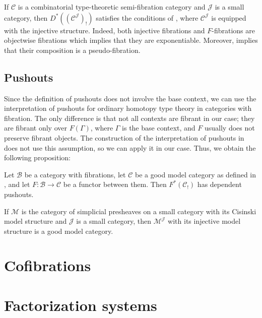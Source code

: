 \documentclass[reqno]{amsart}
\theoremstyle{definition}
\theoremstyle{remark}
\newcommand{\scat}[1]{\mathcal{#1}}
\numberwithin{figure}{section}
\begin{document}
\begin{example}
If $\scat{C}$ is a combinatorial type-theoretic semi-fibration category and $\scat{J}$ is a small category, then $D^*((\scat{C}^\scat{J})_!)$ satisfies the conditions of , where $\scat{C}^\scat{J}$ is equipped with the injective structure.
Indeed, both injective fibrations and $F$-fibrations are objectwise fibrations which implies that they are exponentiable.
Moreover,  implies that their composition is a pseudo-fibration.
\end{example}

\subsection{Pushouts}

Since the definition of pushouts does not involve the base context, we can use the interpretation of pushouts for ordinary homotopy type theory in categories with fibration.
The only difference is that not all contexts are fibrant in our case; they are fibrant only over $F(\Gamma)$, where $\Gamma$ is the base context, and $F$ usually does not preserve fibrant objects.
The construction of the interpretation of pushouts in \cite[Section~6]{lum-shul-hits} does not use this assumption, so we can apply it in our case.
Thus, we obtain the following proposition:

\begin{prop}
Let $\scat{B}$ be a category with fibrations, let $\scat{C}$ be a good model category as defined in \cite[Definition~2.1]{lum-shul-hits}, and let $F : \scat{B} \to \scat{C}$ be a functor between them.
Then $F^*(\scat{C}_!)$ has dependent pushouts.
\end{prop}

\begin{example}
If $\scat{M}$ is the category of simplicial presheaves on a small category with its Cisinski model structure \cite{cisinski-presheaf,cisinski} and $\scat{J}$ is a small category, then $\scat{M}^\scat{J}$ with its injective model structure is a good model category.
\end{example}

\section{Cofibrations}


\section{Factorization systems}
\end{document}
